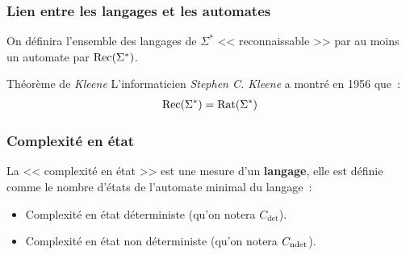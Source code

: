 \subsubsection{Lien entre les langages et les automates}


\begin{frame}{\myframetitle}
  \begin{definition}
    On définira l'ensemble des langages de \(\Sigma^*\) << reconnaissable >> par
    au moins un automate par \(\operatorname*{Rec}(\Sigma^*)\).
  \end{definition}

  \pause[]

  \begin{block}{Théorème de \textit{Kleene}}
    L'informaticien \textit{Stephen C. Kleene} a montré en 1956 que~:
    \begin{align*}
      \operatorname*{Rec}(\Sigma^*) = \operatorname*{Rat}(\Sigma^*)
    \end{align*}
  \end{block}
\end{frame}

\subsubsection{Complexité en état}


\begin{frame}{\myframetitle}
  \begin{definition}
    La << complexité en état >> est une mesure d'un \textbf{langage}, elle est
    définie comme le nombre d'états de l'automate minimal du langage~:

    \vphantom{}

    \begin{itemize}
      \item Complexité en état déterministe (qu'on notera \(C_{\det}\)).
      \item Complexité en état non déterministe (qu'on notera \(C_{\operatorname*{ndet}}\)).
    \end{itemize}
  \end{definition}
\end{frame}

